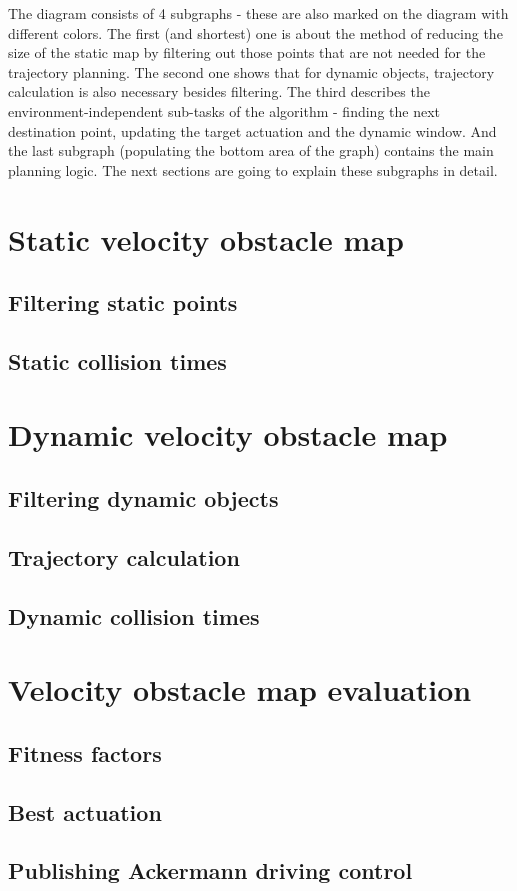 The diagram consists of 4 subgraphs - these are also marked on the diagram with different colors. The first (and shortest) one is about the method of reducing the size of the static map by filtering out those points that are not needed for the trajectory planning. The second one shows that for dynamic objects, trajectory calculation is also necessary besides filtering. The third describes the environment-independent sub-tasks of the algorithm - finding the next destination point, updating the target actuation and the dynamic window. And the last subgraph (populating the bottom area of the graph) contains the main planning logic. The next sections are going to explain these subgraphs in detail.

\section{Static velocity obstacle map}
\label{chap:static_velocity_obstacle_map}

\subsection{Filtering static points}

\subsection{Static collision times}

\section{Dynamic velocity obstacle map}
\label{chap:dynamic_velocity_obstacle_map}

\subsection{Filtering dynamic objects}

\subsection{Trajectory calculation}

\subsection{Dynamic collision times}

\section{Velocity obstacle map evaluation}
\label{chap:velocity_obstacle_map_evaluation}

\subsection{Fitness factors}

\subsection{Best actuation}

\subsection{Publishing Ackermann driving control}
